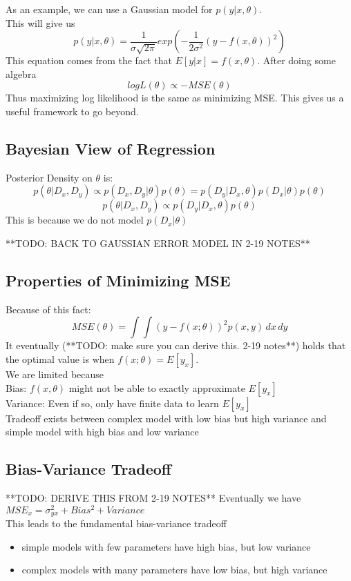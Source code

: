 \documentclass[11pt,psfig]{article}
\begin{document}
As an example, we can use a Gaussian model for $p(y|x,\theta)$.\\
This will give us
\[
p(y|x,\theta) = \frac{1}{\sigma\sqrt{2\pi}} exp(-\frac{1}{2\sigma^2}(y-f(x,\theta))^2)
\]
This equation comes from the fact that $E[y|x] = f(x,\theta)$. 
After doing some algebra
\[
log L(\theta) \propto -MSE(\theta)
\]
Thus maximizing log likelihood is the same as minimizing MSE. This gives us a useful framework to go beyond. 

\subsection*{Bayesian View of Regression}

Posterior Density on $\theta$ is: 
\[
p(\theta|D_x,D_y) \propto p(D_x,D_y|\theta)p(\theta) = p(D_y|D_x,\theta)p(D_x|\theta)p(\theta)
\]
\[
p(\theta|D_x,D_y) \propto p(D_y|D_x,\theta)p(\theta)
\]
This is because we do not model $p(D_x|\theta)$

**TODO: BACK TO GAUSSIAN ERROR MODEL IN 2-19 NOTES**

\subsection*{Properties of Minimizing MSE}

Because of this fact:
\[
MSE(\theta) = \int{\int{(y-f(x;\theta))^2 p(x,y)\,dx}\,dy}
\]
It eventually (**TODO: make sure you can derive this. 2-19 notes**) holds that the optimal value is when $f(x;\theta)=E[y_x]$. \\
We are limited because\\
Bias: $f(x,\theta)$ might not be able to exactly approximate $E[y_x]$\\
Variance: Even if so, only have finite data to learn $E[y_x]$\\
Tradeoff exists between complex model with low bias but high variance and \\
simple model with high bias and low variance

\subsection*{Bias-Variance Tradeoff}

**TODO: DERIVE THIS FROM 2-19 NOTES**
Eventually we have $MSE_x = \sigma_{yx}^2 + Bias^2 + Variance$\\
This leads to the fundamental bias-variance tradeoff
\begin{itemize}
\item simple models with few parameters have high bias, but low variance
\item complex models with many parameters have low bias, but high variance
\end{itemize}
\end{document}
